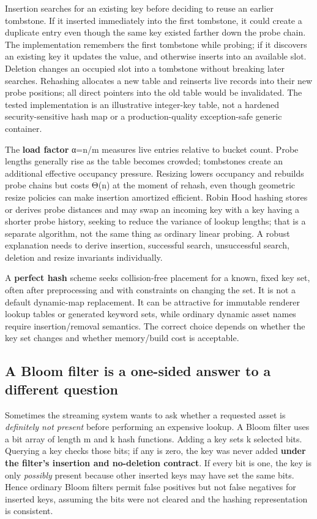 Insertion searches for an existing key before deciding to reuse an earlier tombstone. If it inserted immediately into the first tombstone, it could create a duplicate entry even though the same key existed farther down the probe chain. The implementation remembers the first tombstone while probing; if it discovers an existing key it updates the value, and otherwise inserts into an available slot. Deletion changes an occupied slot into a tombstone without breaking later searches. Rehashing allocates a new table and reinserts live records into their new probe positions; all direct pointers into the old table would be invalidated. The tested implementation is an illustrative integer-key table, not a hardened security-sensitive hash map or a production-quality exception-safe generic container.

The \textbf{load factor} α=n/m measures live entries relative to bucket count. Probe lengths generally rise as the table becomes crowded; tombstones create an additional effective occupancy pressure. Resizing lowers occupancy and rebuilds probe chains but costs Θ(n) at the moment of rehash, even though geometric resize policies can make insertion amortized efficient. Robin Hood hashing stores or derives probe distances and may swap an incoming key with a key having a shorter probe history, seeking to reduce the variance of lookup lengths; that is a separate algorithm, not the same thing as ordinary linear probing. A robust explanation needs to derive insertion, successful search, unsuccessful search, deletion and resize invariants individually.

A \textbf{perfect hash} scheme seeks collision-free placement for a known, fixed key set, often after preprocessing and with constraints on changing the set. It is not a default dynamic-map replacement. It can be attractive for immutable renderer lookup tables or generated keyword sets, while ordinary dynamic asset names require insertion/removal semantics. The correct choice depends on whether the key set changes and whether memory/build cost is acceptable.

\subsection{A Bloom filter is a one-sided answer to a different question}\label{01-foundations-i-ch007-a-bloom-filter-is-a-one-sided-answer-to-a-different-question}

Sometimes the streaming system wants to ask whether a requested asset is \emph{definitely not present} before performing an expensive lookup. A Bloom filter uses a bit array of length m and k hash functions. Adding a key sets k selected bits. Querying a key checks those bits; if any is zero, the key was never added \textbf{under the filter's insertion and no-deletion contract}. If every bit is one, the key is only \emph{possibly} present because other inserted keys may have set the same bits. Hence ordinary Bloom filters permit false positives but not false negatives for inserted keys, assuming the bits were not cleared and the hashing representation is consistent.

